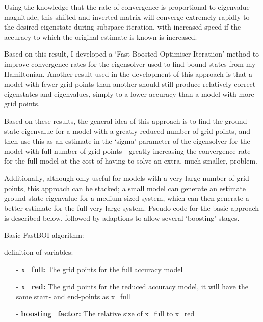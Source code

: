Using the knowledge that the rate of convergence is proportional to eigenvalue magnitude, this shifted and inverted matrix will converge extremely rapidly to the desired eigenstate during subspace iteration, with increased speed if the accuracy to which the original estimate is known is increased.

Based on this result, I developed a `Fast Boosted Optimiser Iteratiion' method to improve convergence rates for the eigensolver used to find bound states from my Hamiltonian. Another result used in the development of this approach is that a model with fewer grid points than another should still produce relatively correct eigenstates and eigenvalues, simply to a lower accuracy than a model with more grid points. 

Based on these results, the general idea of this approach is to find the ground state eigenvalue for a model with a greatly reduced number of grid points, and then use this as an estimate in the `sigma' parameter of the eigensolver for the model with full number of grid points - greatly increasing the convergence rate for the full model at the cost of having to solve an extra, much smaller, problem. 

Additionally, although only useful for models with a very large number of grid points, this approach can be stacked; a small model can generate an estimate ground state eigenvalue for a medium sized system, which can then generate a better estimate for the full very large system. Pseudo-code for the basic approach is described below, followed by  adaptions to allow several `boosting' stages.

Basic FastBOI algorithm:

definition of variables:
\begin{itemize}

	\item[-]{\textbf{x_full:} The grid points for the full accuracy model}
	\item[-]{\textbf{x_red:} The grid points for the reduced accuracy model, it will have the same start- and end-points as x_full}
	\item[-]{\textbf{boosting_factor:} The relative size of x_full to x_red}

\end{itemize}

